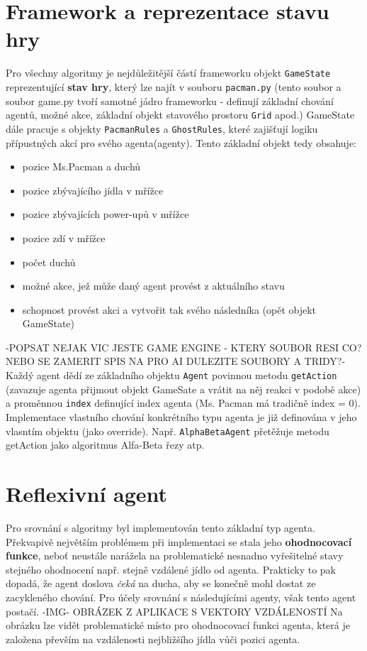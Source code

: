 \begin{enumerate}
\section{Framework a reprezentace stavu hry}
Pro všechny algoritmy je nejdůležitější částí frameworku objekt \texttt{GameState} reprezentující \textbf{stav hry}, který lze najít v souboru \texttt{pacman.py} (tento soubor a soubor game.py tvoří samotné jádro frameworku - definují základní chování agentů, možné akce, základní objekt stavového prostoru \texttt{Grid} apod.)
GameState dále pracuje s objekty \texttt{PacmanRules} a \texttt{GhostRules}, které zajišťují logiku přípustných akcí pro svého agenta(agenty).
Tento základní objekt tedy obsahuje:
\begin{itemize}
\item pozice Ms.Pacman a duchů
\item pozice zbývajícího jídla v mřížce
\item pozice zbývajících power-upů v mřížce
\item pozice zdí v mřížce
\item počet duchů
\item možné akce, jež může daný agent provést z aktuálního stavu
\item schopnost provést akci a vytvořit tak svého následníka (opět objekt GameState)
\end{itemize}
-POPSAT NEJAK VIC JESTE GAME ENGINE - KTERY SOUBOR RESI CO? NEBO SE ZAMERIT SPIS NA PRO AI DULEZITE SOUBORY A TRIDY?-
Každý agent dědí ze základního objektu \texttt{Agent} povinnou metodu \texttt{getAction} (zavazuje agenta přijmout objekt GameSate a vrátit na něj reakci v podobě akce) a proměnnou \texttt{index} definující index agenta (Ms. Pacman má tradičně index = 0).
Implementace vlastního chování konkrétního typu agenta je již definována v jeho vlasntím objektu (jako override). Např. \texttt{AlphaBetaAgent} přetěžuje metodu getAction jako algoritmus Alfa-Beta řezy atp.

\section{Reflexivní agent}
Pro srovnání s algoritmy byl implementován tento základní typ agenta. Překvapivě největším problémem při implementaci se stala jeho \textbf{ohodnocovací funkce}, neboť neustále narážela na problematické nesnadno vyřešitelné stavy stejného ohodnocení např. stejně vzdálené jídlo od agenta. Prakticky to pak dopadá, že agent doslova \textit{čeká} na ducha, aby se konečně mohl dostat ze zacykleného chování. Pro účely srovnání s následujícími agenty, však tento agent postačí.
-IMG- OBRÁZEK Z APLIKACE S VEKTORY VZDÁLENOSTÍ Na obrázku lze vidět problematické místo pro ohodnocovací funkci agenta, která je založena převším na vzdálenosti nejbližšího jídla vůči pozici agenta.


\end{enumerate}
